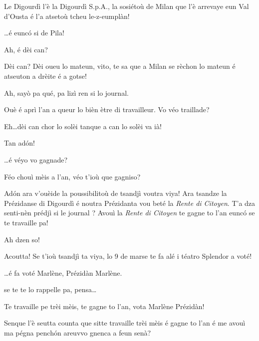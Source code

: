 \begin{drama}

\Dallasspeaks Le Digourdì l'è la Digourdì S.p.A., la sosiétoù de Milan que l'è arrevaye eun Val d'Ousta é l'a atsetoù tcheu le-z-eumplàn!

\Joellespeaks \ldots é eunc\'o si de Pila!

\Jeanspeaks Ah, é dèi can?

\Dallasspeaks Dèi can? Dèi oueu lo mateun, vito, te sa que a Milan se rèchon lo mateun é atseuton a drèite é a gotse!

\Jeanspeaks Ah, sayò pa qué, pa lizì ren si lo journal.

\Joellespeaks Ouè é aprì l'an a queur lo bièn ètre di travailleur. Vo véo traillade?

\Jeanspeaks  Eh\ldots dèi can chor lo solèi tanque a can lo solèi va ià!

\Joellespeaks Tan ad\'on!

\Dallasspeaks \ldots é véyo vo gagnade?

\Jeanspeaks Féo chouì mèis a l'an, véo t'ioù que gagniso?

\Dallasspeaks Ad\'on ara v'ouèide la poussibilitoù de tsandjì voutra viya! Ara tsandze la Prézidanse di Digourdì é noutra Prézidanta vou beté la \textit{Rente di Citoyen}. T'a dza senti-nèn prédjì si le journal \journal ? Avouì la \textit{Rente di Citoyen} te gagne to l'an eunc\'o se te travaille pa!

\Jeanspeaks Ah dzen so!

\Dallasspeaks Acoutta! Se t'ioù tsandjì ta viya, lo 9 de marse te fa alé i téatro Splendor a voté!
 
\Joellespeaks \ldots é fa voté Marlène, Prézidàn Marlène.

\Dallasspeaks {} se te te lo rappelle pa, pensa\ldots
 
\Joelledallasspeaks {} \og Te travaille pe trèi mèis, te gagne to l'an, vota Marlène Prézidàn\fg!



\Saventaspeaks Senque l'è seutta counta que sitte travaille trèi mèis é gagne to l’an é me avouì ma pégna pench\'on areuvvo gnenca a feun senà?


\end{drama}
